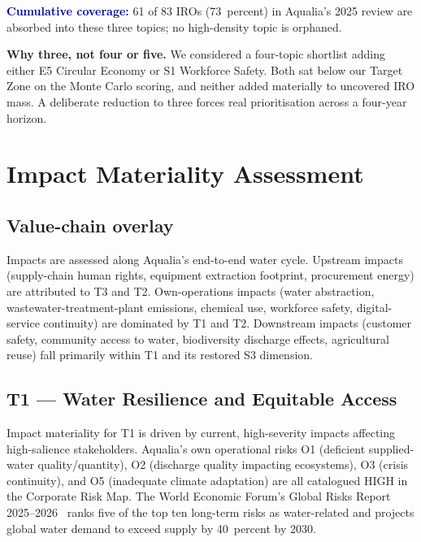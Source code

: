 \documentclass[11pt, a4paper, twoside, openright]{scrreprt}
\newcommand{\signalword}[1]{\textbf{\textcolor{navy}{#1}}}
\begin{document}
\signalword{Cumulative coverage:} 61 of 83 IROs (73~percent) in Aqualia's 2025 review are absorbed into these three topics; no high-density topic is orphaned.

\begin{callout}
\textbf{Why three, not four or five.} We considered a four-topic shortlist adding either E5 Circular Economy or S1 Workforce Safety. Both sat below our Target Zone on the Monte Carlo scoring, and neither added materially to uncovered IRO mass. A deliberate reduction to three forces real prioritisation across a four-year horizon.
\end{callout}

\chapter{Impact Materiality Assessment}
\label{chap:impact}

\section{Value-chain overlay}

Impacts are assessed along Aqualia's end-to-end water cycle. Upstream impacts (supply-chain human rights, equipment extraction footprint, procurement energy) are attributed to T3 and T2. Own-operations impacts (water abstraction, wastewater-treatment-plant emissions, chemical use, workforce safety, digital-service continuity) are dominated by T1 and T2. Downstream impacts (customer safety, community access to water, biodiversity discharge effects, agricultural reuse) fall primarily within T1 and its restored S3 dimension.

\section{T1 --- Water Resilience and Equitable Access}

Impact materiality for T1 is driven by current, high-severity impacts affecting high-salience stakeholders. Aqualia's own operational risks O1 (deficient supplied-water quality/quantity), O2 (discharge quality impacting ecosystems), O3 (crisis continuity), and O5 (inadequate climate adaptation) are all catalogued HIGH in the Corporate Risk Map. The World Economic Forum's Global Risks Report 2025--2026~\cite{wef2025} ranks five of the top ten long-term risks as water-related and projects global water demand to exceed supply by 40~percent by 2030.
\end{document}

